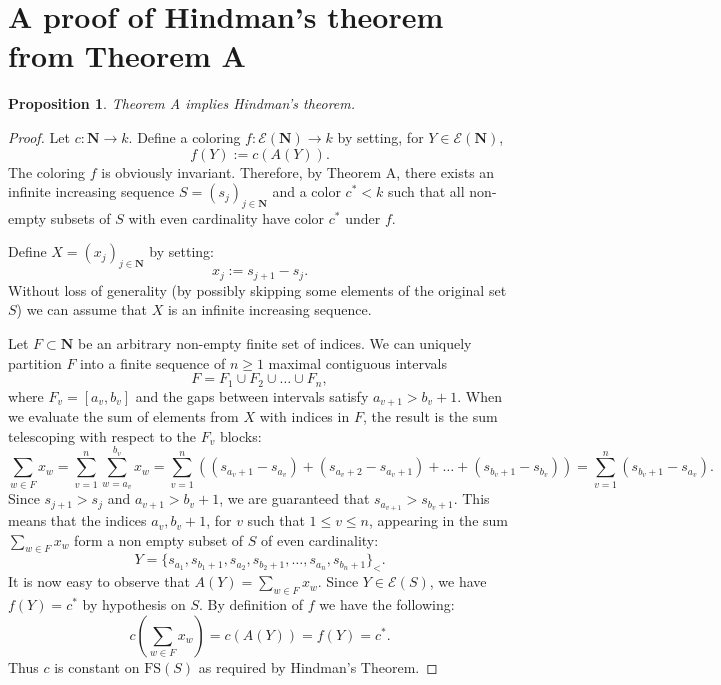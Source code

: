 \documentclass[10pt,a4paper]{amsart}
\newcommand{\Nat}{\mathbf{N}}
\newcommand{\FS}{\mathrm{FS}}
\newtheorem{proposition}{Proposition}[section]
\theoremstyle{definition}
\begin{document}
\section{A proof of Hindman's theorem from Theorem A}

\begin{proposition}\label{prop:AtoHT}
Theorem A implies Hindman's theorem.
\end{proposition}


\begin{proof}
Let $c: \Nat \to k$. Define a coloring $f: \mathcal{E}(\Nat) \to k$ by setting, for $Y \in \mathcal{E}(\Nat)$,
    $$f(Y) := c(A(Y)).$$
The coloring $f$ is obviously invariant. Therefore, by Theorem A, there exists an infinite increasing sequence $S = (s_j)_{j \in \Nat}$ and a color $c^*<k$ such that all non-empty subsets of $S$ with even cardinality have color $c^*$ under $f$. 

Define $X = (x_j)_{j \in \Nat}$ by setting:
    $$x_j := s_{j+1} - s_j.$$
Without loss of generality (by possibly skipping some elements of the original set $S$) we can assume that $X$ is an infinite increasing sequence.

Let $F \subset \Nat$ be an arbitrary non-empty finite set of indices. We can uniquely partition $F$ into a finite sequence of $n\geq 1$ maximal contiguous intervals
    $$F = F_1 \cup F_2 \cup \dots \cup F_n,$$
    where $F_v = [a_v, b_v]$ and the gaps between intervals satisfy $a_{v+1} > b_v + 1$. When we evaluate the sum of elements from $X$ with indices in $F$, the result is the sum telescoping with respect to the $F_v$ blocks:
    $$\sum_{w \in F} x_w = \sum_{v=1}^n \sum_{w=a_v}^{b_v} x_w = \sum_{v=1}^{n}\left((s_{a_v+1}-s_{a_v})+(s_{a_v+2}-s_{a_v+1})+\dots+(s_{b_v+1}-s_{b_v})\right) =\sum_{v=1}^n (s_{b_v+1}-s_{a_v}).$$
    Since $s_{j+1} > s_j$ and $a_{v+1} > b_v + 1$, we are guaranteed that $s_{a_{v+1}} > s_{b_v+1}$. This means that the indices $a_v,b_v+1$, for $v$ such that $1\leq v \leq n$, appearing in the sum $\sum_{w \in F}x_w$ form a non empty subset of $S$ of even cardinality:
    $$Y = \{s_{a_1}, s_{b_1+1}, s_{a_2}, s_{b_2+1}, \dots, s_{a_n}, s_{b_n+1}\}_<.$$
    It is now easy to observe that $A(Y)=\sum_{w \in F}x_w$. Since $Y \in \mathcal{E}(S)$, we have $f(Y) = c^*$ by hypothesis on $S$. By definition of $f$ we have the following:
$$c\left(\sum_{w \in F} x_w\right) = c(A(Y)) = f(Y) = c^*.$$
    Thus $c$ is constant on $\FS(S)$ as required by Hindman's Theorem.

\end{proof}
\end{document}
